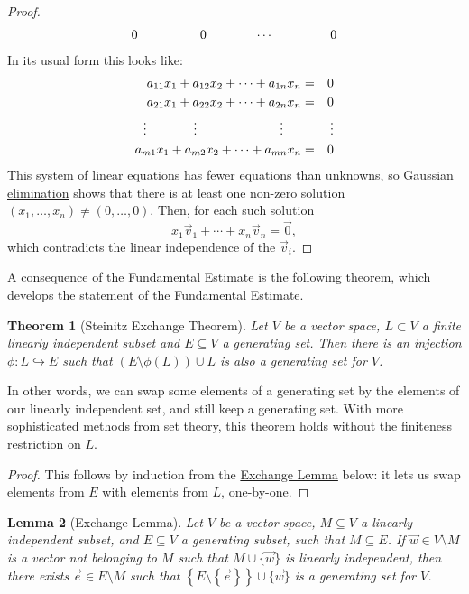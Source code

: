 \documentclass[11pt]{amsbook}
\newtheorem{theorem}{Theorem}[section]
\newtheorem{lemma}[theorem]{Lemma}
\theoremstyle{definition}
\begin{document}
\begin{proof}
\begin{eqnarray*}
0 \hspace{1.75cm} 0 \quad & \hspace{1cm} \cdots & \hspace{1.3cm} 0
\end{eqnarray*}
In its usual form this looks like:
\begin{eqnarray*}
      a_{11} x_1 + a_{12}x_2 +  \cdots  + a_{1n}x_n & =  & 0 \\
      a_{21} x_1 + a_{22}x_2 +  \cdots  + a_{2n}x_n & = & 0 \\
      \vdots  \hspace{13mm} \vdots \hspace{23mm} \vdots \hspace{5mm} &&  \, \vdots \\
      a_{m1} x_1 + a_{m2}x_2 + \cdots  + a_{mn}x_n & =  & 0
\end{eqnarray*}
This system of linear equations has fewer equations than unknowns, so \hyperref[gaussalg]{Gaussian elimination} shows that there is at least one non-zero solution $(x_1, \ldots , x_n) \neq (0, \ldots , 0)$. Then, for each such solution $$x_1 \vec{v}_1 + \cdots + x_n \vec{v}_n = \vec{0},$$ which contradicts the linear independence of the $ \vec{v}_i$.
\end{proof}

A consequence of the Fundamental Estimate is the following theorem, which develops the statement of the Fundamental Estimate.

\begin{theorem}[Steinitz Exchange Theorem]  \label{steinitz} Let $V$ be a vector space, $L\subset V$ a finite linearly independent subset and $E\subseteq V$ a generating set. Then there is an injection $\phi: L \hookrightarrow E$ such that $(E\setminus \phi(L)) \cup L$ is also a generating set for $V$.
\end{theorem}

In other words, we can swap some elements of a generating set by the elements of our linearly independent set, and still keep a generating set. With more sophisticated methods from set theory, this theorem holds without the finiteness restriction on $L$.

\begin{proof} This follows by induction from the \hyperref[exchange]{Exchange Lemma}  below: it lets us swap elements from $E$ with elements from $L$, one-by-one.
\end{proof}

\begin{lemma}[Exchange Lemma] \label{exchange}Let $V$ be a vector space, $M \subseteq V$ a linearly independent subset, and $E\subseteq V$ a generating subset, such that $M \subseteq E$.
If $\vec{w}\in V\setminus M$ is a vector not belonging to $M$ such that $M\cup \{ \vec{w} \}$ is linearly independent, then there exists $\vec{e}\in E\setminus M$ such that $\left\{E\setminus \left\{\vec{e}\right\}\right\}\cup \{ \vec{w}\}$ is a generating set for $V$.
\end{lemma}
\end{document}
